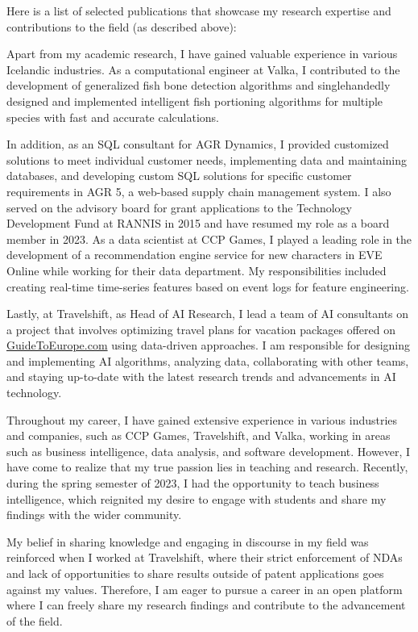 \documentclass{cover}
\begin{document}
{Here is a list of selected publications that showcase my research expertise and contributions to the field (as described above):
\printbibliography[heading=none]


Apart from my academic research, I have gained valuable experience in various Icelandic industries. As a computational engineer at Valka, I contributed to the development of generalized fish bone detection algorithms and singlehandedly designed and implemented intelligent fish portioning algorithms for multiple species with fast and accurate calculations.

In addition, as an SQL consultant for AGR Dynamics, I provided customized solutions to meet individual customer needs, implementing data and maintaining databases, and developing custom SQL solutions for specific customer requirements in AGR 5, a web-based supply chain management system.
I also served on the advisory board for grant applications to the Technology Development Fund at RANNIS in 2015 and have resumed my role as a board member in 2023. As a data scientist at CCP Games, I played a leading role in the development of a recommendation engine service for new characters in EVE Online while working for their data department. My responsibilities included creating real-time time-series features based on event logs for feature engineering.

Lastly, at Travelshift, as Head of AI Research, I lead a team of AI consultants on a project that involves optimizing travel plans for vacation packages offered on \href{https://guidetoeurope.com/best-vacation-packages}{GuideToEurope.com} using data-driven approaches. I am responsible for designing and implementing AI algorithms, analyzing data, collaborating with other teams, and staying up-to-date with the latest research trends and advancements in AI technology.

Throughout my career, I have gained extensive experience in various industries and companies, such as CCP Games, Travelshift, and Valka, working in areas such as business intelligence, data analysis, and software development. However, I have come to realize that my true passion lies in teaching and research. Recently, during the spring semester of 2023, I had the opportunity to teach business intelligence, which reignited my desire to engage with students and share my findings with the wider community.

My belief in sharing knowledge and engaging in discourse in my field was reinforced when I worked at Travelshift, where their strict enforcement of NDAs and lack of opportunities to share results outside of patent applications goes against my values. Therefore, I am eager to pursue a career in an open platform where I can freely share my research findings and contribute to the advancement of the field.

}
\end{document}
